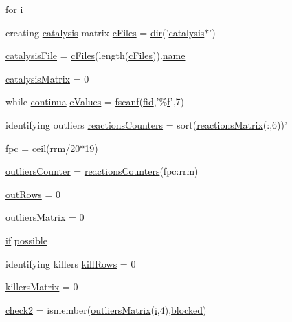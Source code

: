 \begin{DoxyCompactItemize}
for \hyperlink{a00024_ae938073aeda31fad21f2546017d92d4d}{i}
\item 
creating \hyperlink{a00006}{catalysis} matrix \hyperlink{a00024_a9eab57ccb42a39c704f47dc30e4f4515}{c\-Files} = \hyperlink{a00065_a4ca269cf93df1b512b52174c1a256fe5}{dir}('\hyperlink{a00006}{catalysis}$\ast$')
\item 
\hyperlink{a00024_a33e70cf5b45cb59005b82d30202f0b69}{catalysis\-File} = \hyperlink{a00024_a9eab57ccb42a39c704f47dc30e4f4515}{c\-Files}(length(\hyperlink{a00024_a9eab57ccb42a39c704f47dc30e4f4515}{c\-Files})).\hyperlink{a00021_abbf559a76fab59203496b0847ab9502a}{name}
\item 
\hyperlink{a00024_a0810027f58d6be965e44b7b84c44ace8}{catalysis\-Matrix} = 0
\item 
while \hyperlink{a00024_a9c951ebd5bc3f1adce943bee1255f4d6}{continua} \hyperlink{a00024_ad4ba7701967c1da20171228afccb7081}{c\-Values} = \hyperlink{a00019_a028ac102a731e62fb0a7439381f566c1}{fscanf}(\hyperlink{a00025_ae9011d40c6f13e68e6f07156e0da7c5d}{fid},'\%\hyperlink{a00019_a9c5a71c46b1abb8b7df5ebeac6c81535}{f}',7)
\item 
identifying outliers \hyperlink{a00024_aeea253cb98a56047ef20ceed86e2f0ea}{reactions\-Counters} = sort(\hyperlink{a00024_af998036b749d9fa6dd2365f9937279b6}{reactions\-Matrix}(\-:,6))'
\item 
\hyperlink{a00024_ab4459bcd3f7a26410560d9bd951f12bd}{fpc} = ceil(rrm/20$\ast$19)
\item 
\hyperlink{a00024_a7ec5b1f1e07b66a5d6fc972cb8b03c1f}{outliers\-Counter} = \hyperlink{a00024_aeea253cb98a56047ef20ceed86e2f0ea}{reactions\-Counters}(fpc\-:rrm)
\item 
\hyperlink{a00024_a60cfb1ca20cbbc81b85a8f56658b7c99}{out\-Rows} = 0
\item 
\hyperlink{a00024_ad8a18b407726bf44299c9bcf5d1389ff}{outliers\-Matrix} = 0
\item 
\hyperlink{a00024_a01d55766b8058903dd360b4bda71f9f5}{if} \hyperlink{a00024_a07c9e68cdbafe572c04d3112d64deb88}{possible}
\item 
identifying killers \hyperlink{a00024_a0e22d9868b850c50dfc13f5d28db8c30}{kill\-Rows} = 0
\item 
\hyperlink{a00024_a929016802e1ede2217a41240a6974fa6}{killers\-Matrix} = 0
\item 
\hyperlink{a00024_a98a8838a85ed24032563a44271b1525a}{check2} = ismember(\hyperlink{a00024_a9733b61dd859b1133aa3aa849cf70cbc}{outliers\-Matrix}(\hyperlink{a00065_ad3efca1ea6e3333daf30719ee0501862}{i},4),\hyperlink{a00024_a1faaaae288fc8ca4ed1751049aa2f84f}{blocked})

\end{DoxyCompactItemize}
